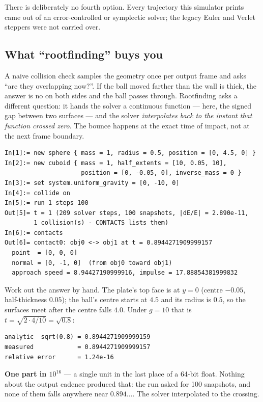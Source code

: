 \documentclass[11pt]{article}
\begin{document}
There is deliberately no fourth option. Every trajectory this simulator
prints came out of an error-controlled or symplectic solver; the legacy
Euler and Verlet steppers were not carried over.

\subsection{What ``rootfinding'' buys you}

A naive collision check samples the geometry once per output frame and
asks ``are they overlapping now?''. If the ball moved farther than the
wall is thick, the answer is no on both sides and the ball passes
through. Rootfinding asks a different question: it hands the solver a
continuous function --- here, the signed gap between two surfaces ---
and the solver \emph{interpolates back to the instant that function
crossed zero}. The bounce happens at the exact time of impact, not at
the next frame boundary.

\begin{lstlisting}
In[1]:= new sphere { mass = 1, radius = 0.5, position = [0, 4.5, 0] }
In[2]:= new cuboid { mass = 1, half_extents = [10, 0.05, 10],
                     position = [0, -0.05, 0], inverse_mass = 0 }
In[3]:= set system.uniform_gravity = [0, -10, 0]
In[4]:= collide on
In[5]:= run 1 steps 100
Out[5]= t = 1 (209 solver steps, 100 snapshots, |dE/E| = 2.890e-11,
        1 collision(s) - CONTACTS lists them)
In[6]:= contacts
Out[6]= contact0: obj0 <-> obj1 at t = 0.8944271909999157
  point  = [0, 0, 0]
  normal = [0, -1, 0]  (from obj0 toward obj1)
  approach speed = 8.94427190999916, impulse = 17.88854381999832
\end{lstlisting}

Work out the answer by hand. The plate's top face is at $y=0$ (centre
$-0.05$, half-thickness $0.05$); the ball's centre starts at $4.5$ and
its radius is $0.5$, so the surfaces meet after the centre falls $4.0$.
Under $g=10$ that is $t=\sqrt{2\cdot 4/10}=\sqrt{0.8}$:

\begin{lstlisting}
analytic  sqrt(0.8) = 0.8944271909999159
measured            = 0.8944271909999157
relative error      = 1.24e-16
\end{lstlisting}

\textbf{One part in $10^{16}$} --- a single unit in the last place of a
64-bit float. Nothing about the output cadence produced that: the run
asked for 100 snapshots, and none of them falls anywhere near
$0.894\ldots$. The solver interpolated to the crossing.
\end{document}
